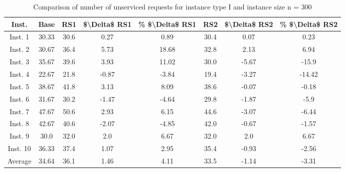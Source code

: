 \begin{table}[H]
\centering
\begin{tabular}{cccccccc}
  \hline
  \textbf{Inst.} & \textbf{Base} & \textbf{RS1} & \textbf{\$\textbackslash{}Delta\$  RS1} & \textbf{\% \$\textbackslash{}Delta\$  RS1} & \textbf{RS2} & \textbf{\$\textbackslash{}Delta\$  RS2} & \textbf{\% \$\textbackslash{}Delta\$  RS2} \\\hline
  Inst. 1 & 30.33 & 30.6 & 0.27 & 0.89 & 30.4 & 0.07 & 0.23 \\
  Inst. 2 & 30.67 & 36.4 & 5.73 & 18.68 & 32.8 & 2.13 & 6.94 \\
  Inst. 3 & 35.67 & 39.6 & 3.93 & 11.02 & 30.0 & -5.67 & -15.9 \\
  Inst. 4 & 22.67 & 21.8 & -0.87 & -3.84 & 19.4 & -3.27 & -14.42 \\
  Inst. 5 & 38.67 & 41.8 & 3.13 & 8.09 & 38.6 & -0.07 & -0.18 \\
  Inst. 6 & 31.67 & 30.2 & -1.47 & -4.64 & 29.8 & -1.87 & -5.9 \\
  Inst. 7 & 47.67 & 50.6 & 2.93 & 6.15 & 44.6 & -3.07 & -6.44 \\
  Inst. 8 & 42.67 & 40.6 & -2.07 & -4.85 & 42.0 & -0.67 & -1.57 \\
  Inst. 9 & 30.0 & 32.0 & 2.0 & 6.67 & 32.0 & 2.0 & 6.67 \\
  Inst. 10 & 36.33 & 37.4 & 1.07 & 2.95 & 35.4 & -0.93 & -2.56 \\
  Average & 34.64 & 36.1 & 1.46 & 4.11 & 33.5 & -1.14 & -3.31 \\\hline
\end{tabular}
\caption{Comparison of number of unserviced requests for instance type I and instance size n = 300}
\label{tab:wait:resrelocation-nTaxi-comparison_I_300}
\end{table}
